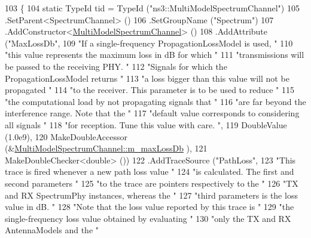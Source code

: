 \begin{DoxyCode}
103 \{
104   \textcolor{keyword}{static} TypeId tid = TypeId (\textcolor{stringliteral}{"ns3::MultiModelSpectrumChannel"})
105     .SetParent<SpectrumChannel> ()
106     .SetGroupName (\textcolor{stringliteral}{"Spectrum"})
107     .AddConstructor<\hyperlink{classns3_1_1MultiModelSpectrumChannel_ac52d8c29e59462d9c2572f473d149b38}{MultiModelSpectrumChannel}> ()
108     .AddAttribute (\textcolor{stringliteral}{"MaxLossDb"},
109                    \textcolor{stringliteral}{"If a single-frequency PropagationLossModel is used, "}
110                    \textcolor{stringliteral}{"this value represents the maximum loss in dB for which "}
111                    \textcolor{stringliteral}{"transmissions will be passed to the receiving PHY.  "}
112                    \textcolor{stringliteral}{"Signals for which the PropagationLossModel returns "}
113                    \textcolor{stringliteral}{"a loss bigger than this value will not be propagated "}
114                    \textcolor{stringliteral}{"to the receiver.  This parameter is to be used to reduce "}
115                    \textcolor{stringliteral}{"the computational load by not propagating signals that "}
116                    \textcolor{stringliteral}{"are far beyond the interference range. Note that the "}
117                    \textcolor{stringliteral}{"default value corresponds to considering all signals "}
118                    \textcolor{stringliteral}{"for reception. Tune this value with care. "},
119                    DoubleValue (1.0e9),
120                    MakeDoubleAccessor (&\hyperlink{classns3_1_1MultiModelSpectrumChannel_ace74651203888ff5d63dfae0c96b0979}{MultiModelSpectrumChannel::m\_maxLossDb}
      ),
121                    MakeDoubleChecker<double> ())
122     .AddTraceSource (\textcolor{stringliteral}{"PathLoss"},
123                      \textcolor{stringliteral}{"This trace is fired whenever a new path loss value "}
124                      \textcolor{stringliteral}{"is calculated. The first and second parameters "}
125                      \textcolor{stringliteral}{"to the trace are pointers respectively to the "}
126                      \textcolor{stringliteral}{"TX and RX SpectrumPhy instances, whereas the "}
127                      \textcolor{stringliteral}{"third parameters is the loss value in dB.  "}
128                      \textcolor{stringliteral}{"Note that the loss value reported by this trace is "}
129                      \textcolor{stringliteral}{"the single-frequency loss value obtained by evaluating "}
130                      \textcolor{stringliteral}{"only the TX and RX AntennaModels and the "}

\end{DoxyCode}
